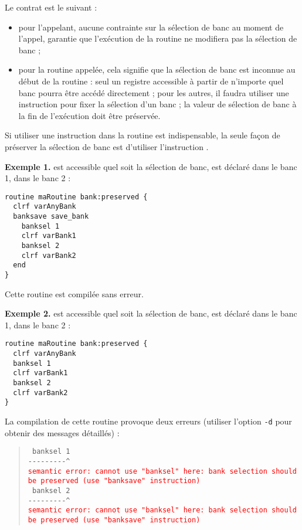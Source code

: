 
Le contrat est le suivant :
\begin{itemize}
  \item pour l'appelant, aucune contrainte sur la sélection de banc au moment de l'appel, garantie que l'exécution de la routine ne modifiera pas la sélection de banc ; 
\item pour la routine appelée, cela signifie que la sélection de banc est inconnue au début de la routine : seul un registre accessible à partir de n'importe quel banc pourra être accédé directement ; pour les autres, il faudra utiliser une instruction  pour fixer la sélection d'un banc ; la valeur de sélection de banc à la fin de l'exécution doit être préservée.
\end{itemize}

Si utiliser une instruction  dans la routine est indispensable, la seule façon de préserver la sélection de banc est d'utiliser l'instruction . 

\textbf{Exemple 1.}  est accessible quel soit la sélection de banc,  est déclaré dans le banc 1,  dans le banc 2 :
\begin{lstlisting}[language=piccolo]
routine maRoutine bank:preserved {
  clrf varAnyBank
  banksave save_bank
    banksel 1
    clrf varBank1
    banksel 2
    clrf varBank2
  end
}
\end{lstlisting}

Cette routine est compilée sans erreur.


\textbf{Exemple 2.}  est accessible quel soit la sélection de banc,  est déclaré dans le banc 1,  dans le banc 2 :
\begin{lstlisting}[language=piccolo]
routine maRoutine bank:preserved {
  clrf varAnyBank
  banksel 1
  clrf varBank1
  banksel 2
  clrf varBank2
}
\end{lstlisting}

La compilation de cette routine provoque deux erreurs (utiliser l’option \texttt{-d} pour obtenir des messages détaillés) :

\begin{quote}
\texttt{ banksel 1}\\
\texttt{-{-}-{-}-{-}-{-}-\^}\\
\textcolor{red}{\tt semantic error: cannot use "banksel" here: bank selection should be preserved (use "banksave" instruction)}\\

\texttt{  banksel 2}\\
\texttt{-{-}-{-}-{-}-{-}-\^}\\
\textcolor{red}{\tt semantic error: cannot use "banksel" here: bank selection should be preserved (use "banksave" instruction)}
\end{quote}














